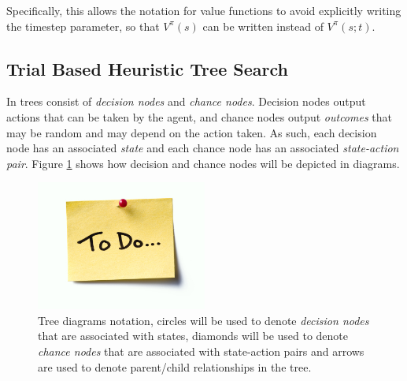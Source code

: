         Specifically, this allows the notation for value functions to avoid explicitly writing the timestep parameter, so that $V^{\pi}(s)$ can be written instead of $V^{\pi}(s;t)$.






    \subsection{Trial Based Heuristic Tree Search}
    \label{sec:2-4-1-thts}
    

        In \thtspp\ewe trees consist of \textit{decision nodes} and \textit{chance nodes}. Decision nodes output actions that can be taken by the agent, and chance nodes output \textit{outcomes} that may be random and may depend on the action taken. As such, each decision node has an associated \textit{state} and each chance node has an associated \textit{state-action pair}. Figure \ref{fig:tree_notation} shows how decision and chance nodes will be depicted in diagrams.

        \begin{figure}
            \centering\includegraphics[width=0.5\textwidth]{figures/todo.jpg} 
            \caption[Tree diagrams notation.]{Tree diagrams notation, circles will be used to denote \textit{decision nodes} that are associated with states, diamonds will be used to denote \textit{chance nodes} that are associated with state-action pairs and arrows are used to denote parent/child relationships in the tree.}
            \label{fig:tree_notation}
        \end{figure}

